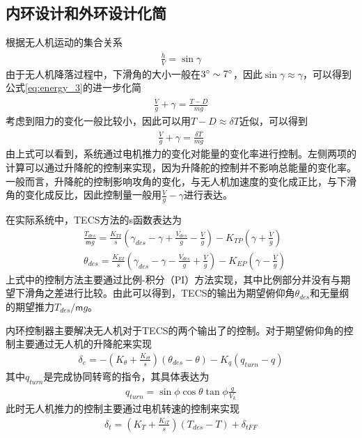 \subsection{内环设计和外环设计化简}
根据无人机运动的集合关系
\begin{align}
\frac{\dot{h}}{V} = \sin \gamma
\end{align}
由于无人机降落过程中，下滑角的大小一般在$3\degree \sim 7\degree$，因此$\sin \gamma \approx \gamma$，可以得到公式\ref{eq:energy_3}的进一步化简
\begin{align}
\frac{\dot{V}}{g} + \gamma =\frac{T-D}{mg}
\end{align}
考虑到阻力的变化一般比较小，因此可以用$T-D\approx \delta T$近似，可以得到
\begin{align}
\frac{\dot{V}}{g} + \gamma = \frac{\delta T}{mg}
\end{align}
由上式可以看到，系统通过电机推力的变化对能量的变化率进行控制。左侧两项的计算可以通过升降舵的控制来实现，因为升降舵的控制并不影响总能量的变化率。一般而言，升降舵的控制影响攻角的变化，与无人机加速度的变化成正比，与下滑角的变化成反比，因此控制量一般用$\frac{\dot{V}}{g} - \gamma $进行表达。

在实际系统中，TECS方法的s函数表达为
\begin{align}
&\frac{T_{des}}{\mathsf{m}g} = \frac{K_{TI}}{s} (\gamma_{des} - \gamma + \frac{\dot{V_{des}}}{g} - \frac{\dot{V}}{g}) - K_{TP}(\gamma + \frac{ \dot{V}}{g}) \\
&\theta_{des} = \frac{K_{EI}}{s} (\gamma_{des} - \gamma - \frac{\dot{V_{des}}}{g} + \frac{\dot{V}}{g}) - K_{EP}(\gamma - \frac{ \dot{V}}{g})
\end{align}
上式中的控制方法主要通过比例-积分（PI）方法实现，其中比例部分并没有与期望下滑角之差进行比较。由此可以得到，TECS的输出为期望俯仰角$\theta_{des}$和无量纲的期望推力$T_{des}/\mathsf{m}g$。

内环控制器主要解决无人机对于TECS的两个输出了的控制。对于期望俯仰角的控制主要通过无人机的升降舵来实现
\begin{align}
\delta_e = -(K_\theta+\frac{K_{i\theta}}{s})(\theta_{des}-\theta)-K_q(q_{turn}-q)
\end{align}
其中$q_{turn}$是完成协同转弯的指令，其具体表达为
\begin{align}
q_{turn} = \sin\phi \cos\theta\tan \phi \frac{g}{V_k}
\end{align}
此时无人机推力的控制主要通过电机转速的控制来实现
\begin{align}
\delta_t = (K_T + \frac{K_{iT}}{s})(T_{des} - T) + \delta_{tFF}
\end{align}


